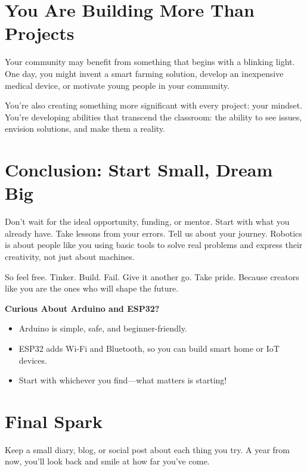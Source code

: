 \documentclass[a4paper,10pt,twocolumn]{memoir}
\begin{document}
\section*{You Are Building More Than Projects}
Your community may benefit from something that begins with a blinking light. One day, you might invent a smart farming solution, develop an inexpensive medical device, or motivate young people in your community.

You’re also creating something more significant with every project: your mindset. You’re developing abilities that transcend the classroom: the ability to see issues, envision solutions, and make them a reality.
\section*{Conclusion: Start Small, Dream Big}
Don’t wait for the ideal opportunity, funding, or mentor. Start with what you already have. Take lessons from your errors. Tell us about your journey. Robotics is about people like you using basic tools to solve real problems and express their creativity, not just about machines.

So feel free. Tinker. Build. Fail. Give it another go. Take pride. Because creators like you are the ones who will shape the future.
\begin{center}
\begin{boxedminipage}{0.8\textwidth}
\textbf{Curious About Arduino and ESP32?}
\begin{itemize}
    \item Arduino is simple, safe, and beginner-friendly.
    \item ESP32 adds Wi-Fi and Bluetooth, so you can build smart home or IoT devices.
    \item Start with whichever you find—what matters is starting!
\end{itemize}
\end{boxedminipage}
\end{center}
\section*{Final Spark}
Keep a small diary, blog, or social post about each thing you try. A year from now, you’ll look back and smile at how far you’ve come.
\clearpage
\end{document}
